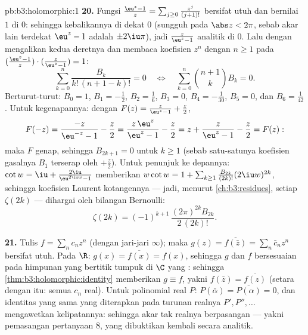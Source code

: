 \begin{solution}{pb:b3:holomorphic:1}
\textbf{20.} Fungsi $\frac{\eu^z - 1}z =
\sum_{j\geq0}\frac{z^j}{(j+1)!}$ bersifat utuh dan bernilai $1$ di
$0$: sehingga kebalikannya  di dekat $0$ (sungguh pada $\abs z <
2\pi$, sebab akar lain terdekat $\eu^z - 1$ adalah
$\pm2\iu\pi$), jadi $\frac z{\eu^z-1}$ analitik di $0$.
Lalu dengan mengalikan kedua deretnya dan membaca koefisien
$z^n$ dengan $n \geq 1$ pada $(\frac{\eu^z-1}z)\cdot(\frac
z{\eu^z-1}) = 1$:
\[
\sum_{k=0}^{n}\frac{B_k}{k!\,(n+1-k)!} = 0
\quad\Longleftrightarrow\quad
\sum_{k=0}^{n}\binom{n+1}{k}B_k = 0 .
\]
Berturut-turut: $B_0 = 1$, $B_1 = -\frac12$, $B_2 = \frac16$,
$B_3 = 0$, $B_4 = -\frac1{30}$, $B_5 = 0$, dan $B_6 =
\frac1{42}$. Untuk kegenapannya: dengan $F(z) = \frac z{\eu^z-1} +
\frac z2$,
\[
F(-z) = \frac{-z}{\eu^{-z} - 1} - \frac z2
= \frac{z\,\eu^z}{\eu^z - 1} - \frac z2
= z + \frac{z}{\eu^z - 1} - \frac z2 = F(z) :
\]
maka $F$ genap, sehingga $B_{2k+1} = 0$ untuk $k \geq 1$ (sebab satu-satunya
koefisien gasalnya $B_1$ terserap oleh $+\frac z2$). Untuk penunjuk
ke depannya: $\cot w = \iu + \frac{2\iu}{\eu^{2\iu w}-1}$ memberikan
$w\cot w = 1 + \sum_{k\geq1}\frac{B_{2k}}{(2k)!}(2\iu
w)^{2k}$, sehingga koefisien Laurent kotangennya ---
jadi, menurut \cref{ch:b3:residues}, setiap $\zeta(2k)$ --- dihargai
oleh bilangan Bernoulli:
\[
\zeta(2k) = (-1)^{k+1}\,\frac{(2\pi)^{2k}B_{2k}}{2\,(2k)!} .
\]

\textbf{21.} Tulis $f = \sum_nc_nz^n$ (dengan jari-jari $\infty$);
maka $g(z) = \overline{f(\bar z)} = \sum_n\bar c_nz^n$ bersifat
utuh. Pada $\R$: $g(x) = \overline{f(x)} = f(x)$, sehingga $g$ dan
$f$ bersesuaian pada himpunan yang bertitik tumpuk di $\C$ yang
: sehingga \cref{thm:b3:holomorphic:identity} memberikan $g \equiv f$,
yakni $f(\bar z) = \overline{f(z)}$ (setara dengan itu: semua
$c_n$ real). Untuk polinomial real $P$:
$P(\bar\alpha) = \overline{P(\alpha)} = 0$, dan identitas yang sama
yang diterapkan pada turunan realnya $P', P'', \dots$
mengawetkan kelipatannya: sehingga akar tak realnya berpasangan ---
yakni pemasangan pertanyaan 8, yang dibuktikan kembali secara analitik.


\end{solution}
